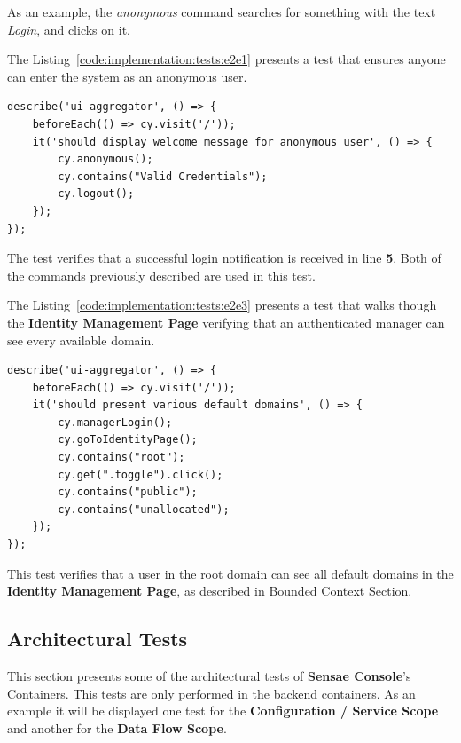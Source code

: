 As an example, the \textit{anonymous} command searches for something with the text \textit{Login}, and clicks on it.

The Listing~\ref{code:implementation:tests:e2e1} presents a test that ensures anyone can enter the system as an anonymous user.

\begin{lstlisting}[style=javascript, caption=End-to-End Test - Anonymous Authentication - \textbf{UI Aggregator}, label={code:implementation:tests:e2e1}]
describe('ui-aggregator', () => {
    beforeEach(() => cy.visit('/'));
    it('should display welcome message for anonymous user', () => {
        cy.anonymous();
        cy.contains("Valid Credentials");
        cy.logout();
    });
});
\end{lstlisting}

The test verifies that a successful login notification is received in line \textbf{5}. Both of the commands previously described are used in this test.

The Listing~\ref{code:implementation:tests:e2e3} presents a test that walks though the \textbf{Identity Management Page} verifying that an authenticated manager can see every available domain.

\begin{lstlisting}[style=javascript, caption=End-to-End Test - Discover Available Domains - \textbf{Identity Management}, label={code:implementation:tests:e2e3}]
describe('ui-aggregator', () => {
    beforeEach(() => cy.visit('/'));
    it('should present various default domains', () => {
        cy.managerLogin();
        cy.goToIdentityPage();
        cy.contains("root");
        cy.get(".toggle").click();
        cy.contains("public");
        cy.contains("unallocated");
    });
});
\end{lstlisting}

This test verifies that a user in the root domain can see all default domains in the \textbf{Identity Management Page}, as described in  Bounded Context Section.

\subsection{Architectural Tests}
\label{subsec:implementation:tests:arch}

This section presents some of the architectural tests of \textbf{Sensae Console}'s Containers. This tests are only performed in the backend containers.
As an example it will be displayed one test for the \textbf{Configuration / Service Scope} and another for the \textbf{Data Flow Scope}.

